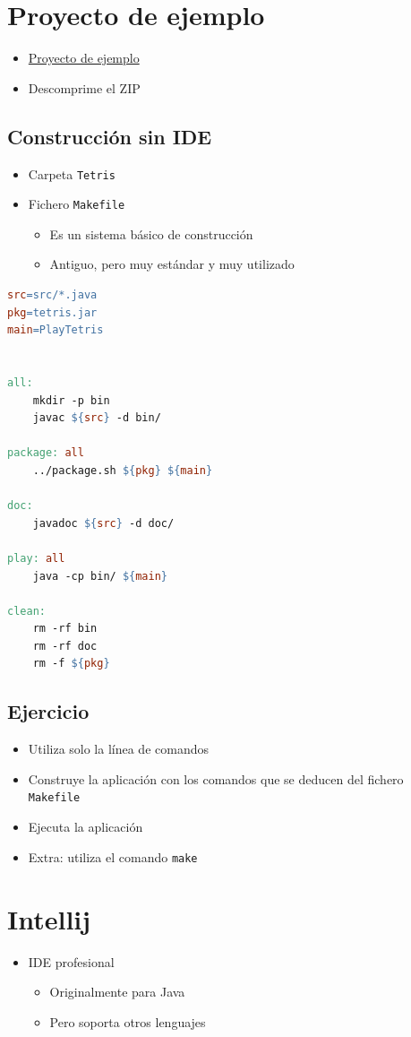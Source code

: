 \documentclass[a4paper]{article}
\begin{document}
\section{Proyecto de ejemplo}
\label{sec:org0000024}
\begin{itemize}
\item \href{sin-construccion.zip}{Proyecto de ejemplo}
\item Descomprime el ZIP
\end{itemize}
\subsection{Construcción sin IDE}
\label{sec:org000001e}
\begin{itemize}
\item Carpeta \texttt{Tetris}
\item Fichero \texttt{Makefile}
\begin{itemize}
\item Es un sistema básico de construcción
\item Antiguo, pero muy estándar y muy utilizado
\end{itemize}
\end{itemize}

\begin{lstlisting}[language=make,numbers=none]
src=src/*.java
pkg=tetris.jar
main=PlayTetris


all:
	mkdir -p bin
	javac ${src} -d bin/

package: all
	../package.sh ${pkg} ${main}

doc:
	javadoc ${src} -d doc/

play: all
	java -cp bin/ ${main}

clean:
	rm -rf bin
	rm -rf doc
	rm -f ${pkg}
\end{lstlisting}
\subsection{Ejercicio}
\label{sec:org0000021}
\begin{itemize}
\item Utiliza solo la línea de comandos
\item Construye la aplicación con los comandos que se deducen del fichero \texttt{Makefile}
\item Ejecuta la aplicación
\item Extra: utiliza el comando \texttt{make}
\end{itemize}
\section{Intellij}
\label{sec:org000002d}
\begin{itemize}
\item IDE profesional
\begin{itemize}
\item Originalmente para Java
\item Pero soporta otros lenguajes
\end{itemize}
\end{itemize}
\end{document}
